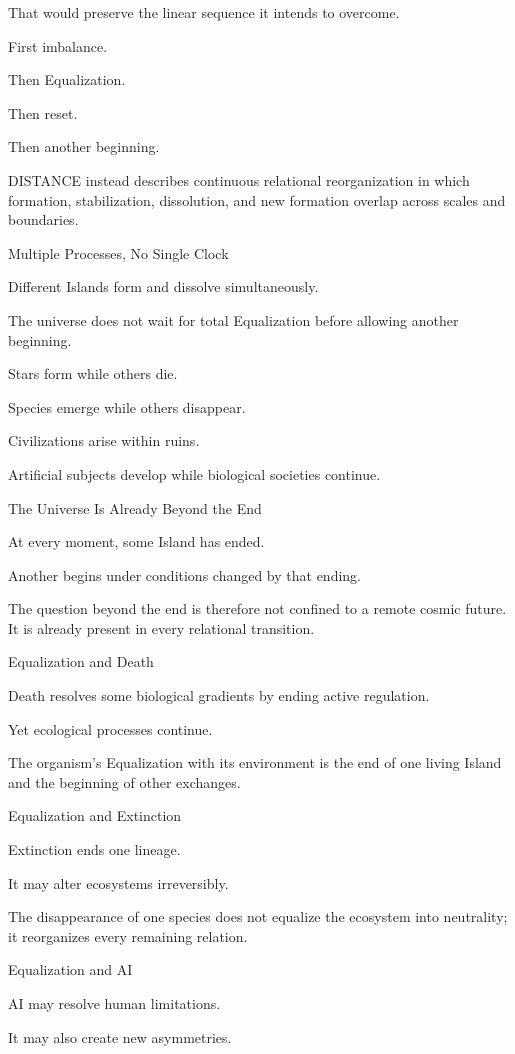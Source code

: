 That would preserve the linear sequence it intends to overcome.

First imbalance.

Then Equalization.

Then reset.

Then another beginning.

DISTANCE instead describes continuous relational reorganization in which formation, stabilization, dissolution, and new formation overlap across scales and boundaries.

Multiple Processes, No Single Clock

Different Islands form and dissolve simultaneously.

The universe does not wait for total Equalization before allowing another beginning.

Stars form while others die.

Species emerge while others disappear.

Civilizations arise within ruins.

Artificial subjects develop while biological societies continue.

The Universe Is Already Beyond the End

At every moment, some Island has ended.

Another begins under conditions changed by that ending.

The question beyond the end is therefore not confined to a remote cosmic future. It is already present in every relational transition.

Equalization and Death

Death resolves some biological gradients by ending active regulation.

Yet ecological processes continue.

The organism’s Equalization with its environment is the end of one living Island and the beginning of other exchanges.

Equalization and Extinction

Extinction ends one lineage.

It may alter ecosystems irreversibly.

The disappearance of one species does not equalize the ecosystem into neutrality; it reorganizes every remaining relation.

Equalization and AI

AI may resolve human limitations.

It may also create new asymmetries.

